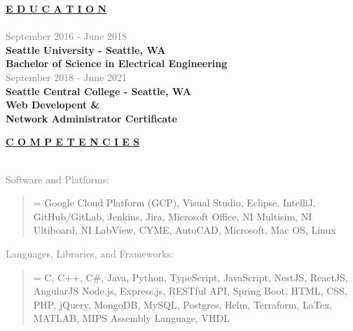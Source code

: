 \documentclass[letterpage]{article}
\newlength{\quoteleftskip}            %
\begin{document}
\begin{minipage}[t]{0.424\linewidth}
\vspace{3pt}
\textbf{\fontsize{14px}{1px}\selectfont
  \ul{E D U C A T I O N}
}\\
\vspace{5px}\\
\textcolor{gray}{September 2016 - June 2018}\\
\textbf{\textsf{Seattle University - Seattle, WA}}\\
\textbf{Bachelor of Science in Electrical Engineering}\\

\textcolor{gray}{September 2018 - June 2021}\\
\textbf{\textsf{Seattle Central College - Seattle, WA}}\\
\textbf{Web Developent \& }\\
\textbf{Network Administrator Certificate}\\
\vspace{8px}

\textbf{\fontsize{14px}{1px}\selectfont
  \ul{C O M P E T E N C I E S}
}\\
\vspace{-5px}\\
\begin{minipage}[t]{0.01\linewidth}
  \end{minipage}
  \: %

  \vspace{1px}
  \textcolor{gray}{Software and Platforms:}\\
  \begin{quote}
      \leftskip=\quoteleftskip
      \textmd{Google Cloud Platform (GCP), Visual Studio, Eclipse, IntelliJ, GitHub/GitLab, Jenkins, Jira, Microsoft Office, NI
      Multisim, NI Ultiboard, NI LabView, CYME, AutoCAD, Microsoft, Mac OS,
      Linux}\\
  \end{quote}

  \vspace{7px}
  \textcolor{gray}{Languages, Libraries, and Frameworks:} \\ 
  \begin{quote}
    \leftskip=\quoteleftskip
    \textmd{C, C++, C\#, Java, Python, TypeScript, JavaScript, NestJS, ReactJS, AngularJS Node.js, Express.js, RESTful API, Spring Boot,  HTML, CSS, PHP, jQuery,
    MongoDB, MySQL, Postgres, Helm, Terraform,  LaTex, MATLAB, MIPS Assembly
    Language, VHDL}\\
  \end{quote}


\end{minipage}
\end{document}
